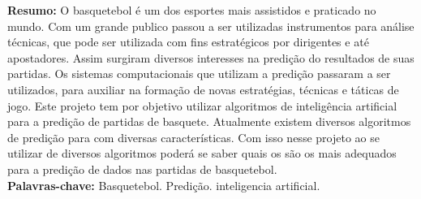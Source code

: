 \begin{singlespace}
\textbf{Resumo:}
O basquetebol é um dos esportes mais assistidos e praticado no mundo. Com um grande publico passou a ser utilizadas instrumentos para análise técnicas, que pode ser utilizada com fins estratégicos por dirigentes e até apostadores. Assim surgiram diversos interesses na predição do resultados de suas partidas. Os sistemas computacionais que utilizam a predição passaram a ser utilizados, para auxiliar na formação de novas estratégias, técnicas e táticas de jogo. Este projeto tem por objetivo utilizar algoritmos de inteligência artificial para a predição de partidas de basquete. Atualmente existem diversos algoritmos de predição para com diversas características. Com isso nesse projeto ao se utilizar de diversos algoritmos poderá se saber quais os são os mais adequados para a predição de dados nas partidas de basquetebol.\\
\textbf{Palavras-chave: }
Basquetebol. Predição. inteligencia artificial.
\end{singlespace}
